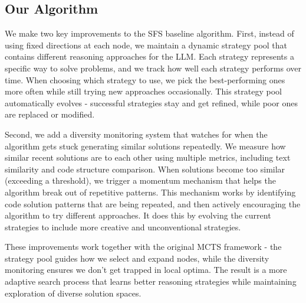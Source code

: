 \documentclass[11pt]{article}
\theoremstyle{definition}
\theoremstyle{remark}
\begin{document}
\subsection{Our Algorithm}

We make two key improvements to the SFS baseline algorithm. First, instead of using fixed directions at each node, we maintain a dynamic strategy pool that contains different reasoning approaches for the LLM. Each strategy represents a specific way to solve problems, and we track how well each strategy performs over time. When choosing which strategy to use, we pick the best-performing ones more often while still trying new approaches occasionally. This strategy pool automatically evolves - successful strategies stay and get refined, while poor ones are replaced or modified.

Second, we add a diversity monitoring system that watches for when the algorithm gets stuck generating similar solutions repeatedly. We measure how similar recent solutions are to each other using multiple metrics, including text similarity and code structure comparison. When solutions become too similar (exceeding a threshold), we trigger a momentum mechanism that helps the algorithm break out of repetitive patterns. This mechanism works by identifying code solution patterns that are being repeated, and then actively encouraging the algorithm to try different approaches. It does this by evolving the current strategies to include more creative and unconventional strategies.

These improvements work together with the original MCTS framework - the strategy pool guides how we select and expand nodes, while the diversity monitoring ensures we don't get trapped in local optima. The result is a more adaptive search process that learns better reasoning strategies while maintaining exploration of diverse solution spaces.
\clearpage
\nolinenumbers
\onecolumn
\end{document}

